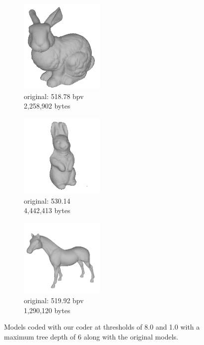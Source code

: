 \begin{figure}[!htb]
        \begin{subfigure}[b]{1.9in}
                \includegraphics[width=1.6in]{images/results/compression/bunnyorig}
                \caption{original: 518.78 bpv\\2,258,902 bytes}
                \label{fig:FIG_BUNNYO}
        \end{subfigure}%
        \begin{subfigure}[b]{1.9in}
                \includegraphics[width=1.6in]{images/results/compression/rabbitorig}
                \caption{original: 530.14\\4,442,413 bytes}
                \label{fig:FIG_RABBITO}
        \end{subfigure}%
        \begin{subfigure}[b]{1.9in}
                \includegraphics[width=1.6in]{images/results/compression/horseorig}
                \caption{original: 519.92 bpv\\1,290,120 bytes}
                \label{fig:FIG_HORSEO}
        \end{subfigure}
       
       \caption{Models coded with our coder at thresholds of 8.0 and 1.0 with a maximum tree depth of 6 along with the original models.}
       \label{fig:FIGS}
\end{figure}

